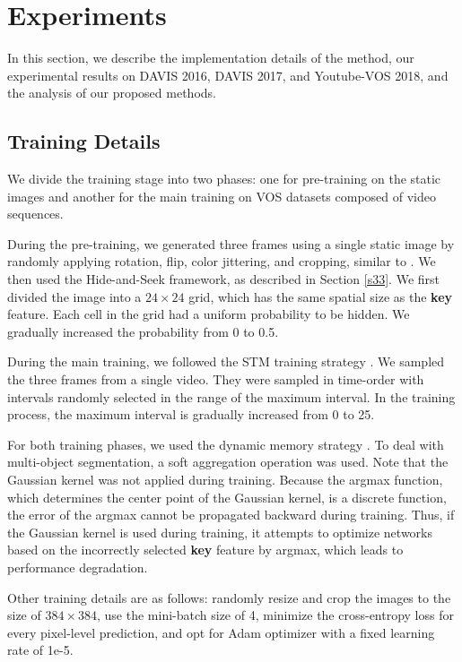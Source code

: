 \section{Experiments}
\label{s4}
In this section, we describe the implementation details of the method, our experimental results on DAVIS 2016, DAVIS 2017, and Youtube-VOS 2018, and the analysis of our proposed methods.

\subsection{Training Details}
\label{s41}
We divide the training stage into two phases: one for pre-training on the static images and another for the main training on VOS datasets composed of video sequences.

During the pre-training, we generated three frames using a single static image by randomly applying rotation, flip, color jittering, and cropping, similar to \cite{wug2018fast,Oh_2019_ICCV}. We then used the Hide-and-Seek framework, as described in Section \ref{s33}. We first divided the image into a $24 \times 24$ grid, which has the same spatial size as the \textbf{key} feature. Each cell in the grid had a uniform probability to be hidden. We gradually increased the probability from 0 to 0.5.

During the main training, we followed the STM training strategy \cite{Oh_2019_ICCV}. We sampled the three frames from a single video. They were sampled in time-order with intervals randomly selected in the range of the maximum interval. In the training process, the maximum interval is gradually increased from 0 to 25.

For both training phases, we used the dynamic memory strategy \cite{Oh_2019_ICCV}. To deal with multi-object segmentation, a soft aggregation operation \cite{Oh_2019_ICCV} was used. Note that the Gaussian kernel was not applied during training. Because the argmax function, which determines the center point of the Gaussian kernel, is a discrete function, the error of the argmax cannot be propagated backward during training. Thus, if the Gaussian kernel is used during training, it attempts to optimize networks based on the incorrectly selected \textbf{key} feature by argmax, which leads to performance degradation.

Other training details are as follows: randomly resize and crop the images to the size of $384 \times 384$, use the mini-batch size of 4, minimize the cross-entropy loss for every pixel-level prediction, and opt for Adam optimizer \cite{KingmaB14} with a fixed learning rate of 1e-5.

